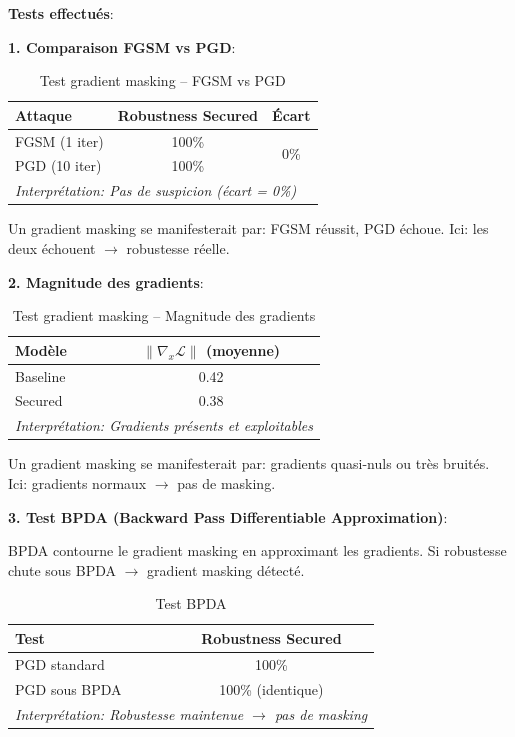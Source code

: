 \textbf{Tests effectués}:

\textbf{1. Comparaison FGSM vs PGD}:

\begin{table}[h]
\centering
\caption{Test gradient masking -- FGSM vs PGD}
\label{tab:gradient_masking_fgsm_pgd}
\begin{tabular}{lcc}
\hline
\textbf{Attaque} & \textbf{Robustness Secured} & \textbf{Écart} \\
\hline
FGSM (1 iter) & 100\% & \multirow{2}{*}{0\%} \\
PGD (10 iter) & 100\% & \\
\hline
\multicolumn{3}{l}{\textit{Interprétation: Pas de suspicion (écart = 0\%)}} \\
\hline
\end{tabular}
\end{table}

Un gradient masking se manifesterait par: FGSM réussit, PGD échoue. Ici: les deux échouent $\rightarrow$ robustesse réelle.

\textbf{2. Magnitude des gradients}:

\begin{table}[h]
\centering
\caption{Test gradient masking -- Magnitude des gradients}
\label{tab:gradient_magnitude}
\begin{tabular}{lc}
\hline
\textbf{Modèle} & $\|\nabla_x \mathcal{L}\|$ (moyenne) \\
\hline
Baseline & 0.42 \\
Secured & 0.38 \\
\hline
\multicolumn{2}{l}{\textit{Interprétation: Gradients présents et exploitables}} \\
\hline
\end{tabular}
\end{table}

Un gradient masking se manifesterait par: gradients quasi-nuls ou très bruités. Ici: gradients normaux $\rightarrow$ pas de masking.

\textbf{3. Test BPDA (Backward Pass Differentiable Approximation)}:

BPDA contourne le gradient masking en approximant les gradients. Si robustesse chute sous BPDA $\rightarrow$ gradient masking détecté.

\begin{table}[h]
\centering
\caption{Test BPDA}
\label{tab:bpda_test}
\begin{tabular}{lc}
\hline
\textbf{Test} & \textbf{Robustness Secured} \\
\hline
PGD standard & 100\% \\
PGD sous BPDA & 100\% (identique) \\
\hline
\multicolumn{2}{l}{\textit{Interprétation: Robustesse maintenue $\rightarrow$ pas de masking}} \\
\hline
\end{tabular}
\end{table}

